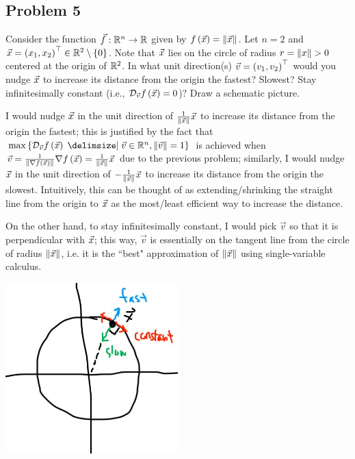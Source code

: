 \documentclass[main.tex]{subfiles}
\begin{document}
\subsection{Problem 5}
\begin{claim}
    Consider the function $\vec{f} : \mathbb R^n \to \mathbb R$ given by $f\left( \vec{x} \right) = \left\lVert \vec{x} \right\rVert$. Let $n = 2$ and $\vec{x} = \left( x_1,x_2 \right)^\top \in \mathbb R^2 \setminus \left\{ 0 \right\}$. Note that $\vec{x}$ lies on the circle of radius $r = \left\lVert x \right\rVert > 0$ centered at the origin of $\mathbb R^2$. In what unit direction(s) $\vec{v} = \left( v_1,v_2 \right)^\top$ would you nudge $\vec{x}$ to increase its distance from the origin the fastest? Slowest? Stay infinitesimally constant (i.e., $\mathcal{D}_{\vec{v}}f\left( \vec{x} \right) = 0$)? Draw a schematic picture.
\end{claim}

\begin{soln}
    I would nudge $\vec{x}$ in the unit direction of $\frac{1}{\left\lVert \vec{x} \right\rVert}\vec{x}$ to increase its distance from the origin the fastest; this is justified by the fact that $\max\braces{\mathcal{D}_{\vec{v}}f\parens{\vx} \mid \vec{v} \in \RR^n , \norm{\vec{v}} = 1}$ is achieved when $\vec{v} = \frac{1}{\left\lVert \nabla f\left( \vec{x} \right) \right\rVert} \nabla f\left( \vec{x} \right) = \frac{1}{\left\lVert \vec{x} \right\rVert}\vec{x}$ due to the previous problem; similarly, I would nudge $\vec{x}$ in the unit direction of $-\frac{1}{\left\lVert \vec{x} \right\rVert}\vec{x}$ to increase its distance from the origin the slowest. Intuitively, this can be thought of as extending/shrinking the straight line from the origin to $\vec{x}$ as the most/least efficient way to increase the distance.
    
    On the other hand, to stay infinitesimally constant, I would pick $\vec{v}$ so that it is perpendicular with $\vec{x}$; this way, $\vec{v}$ is essentially on the tangent line from the circle of radius $\left\lVert \vec{x} \right\rVert$, i.e. it is the ``best" approximation of $\left\lVert \vec{x} \right\rVert$ using single-variable calculus.
    \begin{center}
        \includegraphics[width = 0.5\textwidth]{pset9p5.JPG}
    \end{center}
\end{soln}
\eject
\end{document}
